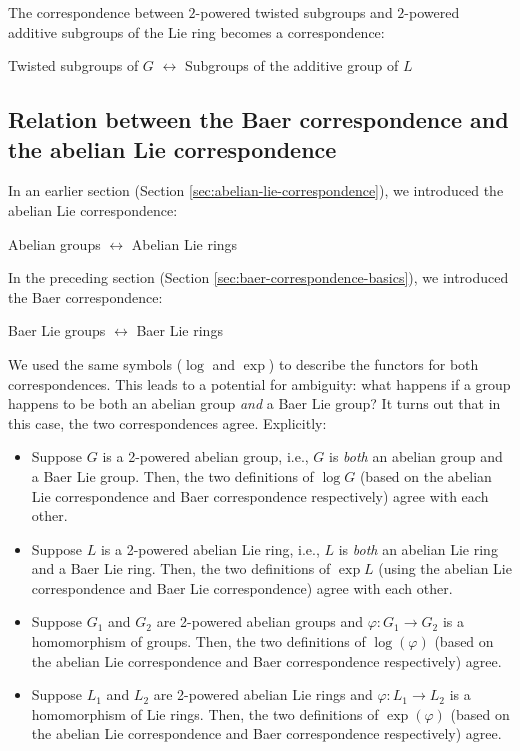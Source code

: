 The correspondence between $2$-powered twisted subgroups and
$2$-powered additive subgroups of the Lie ring becomes a
correspondence:

\begin{center}
  Twisted subgroups of $G$ $\leftrightarrow$ Subgroups of the additive
  group of $L$
\end{center}

\subsection{Relation between the Baer correspondence and the abelian Lie correspondence}\label{sec:baer-correspondence-abelian-lie-correspondence-relation}

In an earlier section (Section
\ref{sec:abelian-lie-correspondence}), we introduced the abelian Lie
correspondence:

\begin{center}
  Abelian groups $\leftrightarrow$ Abelian Lie rings
\end{center}

In the preceding section (Section
\ref{sec:baer-correspondence-basics}), we introduced the Baer
correspondence:

\begin{center}
  Baer Lie groups $\leftrightarrow$ Baer Lie rings
\end{center}

We used the same symbols ($\log$ and $\exp$) to describe the functors
for both correspondences. This leads to a potential for ambiguity:
what happens if a group happens to be both an abelian group {\em and}
a Baer Lie group? It turns out that in this case, the two
correspondences agree. Explicitly:

\begin{itemize}
\item Suppose $G$ is a 2-powered abelian group, i.e., $G$ is {\em
  both} an abelian group and a Baer Lie group. Then, the two
  definitions of $\log G$ (based on the abelian Lie correspondence and
  Baer correspondence respectively) agree with each other.
\item Suppose $L$ is a 2-powered abelian Lie ring, i.e., $L$ is {\em
  both} an abelian Lie ring and a Baer Lie ring. Then, the two
  definitions of $\exp L$ (using the abelian Lie correspondence and
  Baer Lie correspondence) agree with each other.
\item Suppose $G_1$ and $G_2$ are 2-powered abelian groups and
  $\varphi:G_1 \to G_2$ is a homomorphism of groups. Then, the two
  definitions of $\log(\varphi)$ (based on the abelian Lie
  correspondence and Baer correspondence respectively) agree.
\item Suppose $L_1$ and $L_2$ are 2-powered abelian Lie rings and
  $\varphi:L_1 \to L_2$ is a homomorphism of Lie rings. Then, the two
  definitions of $\exp(\varphi)$ (based on the abelian Lie
  correspondence and Baer correspondence respectively) agree.
\end{itemize}

